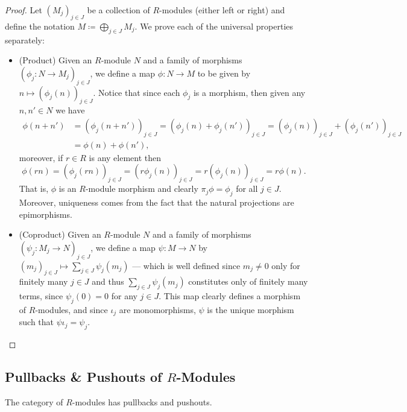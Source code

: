 \begin{proof}
Let \((M_j)_{j \in J}\) be a collection of \(R\)-modules (either left or right)
and define the notation \(M \coloneq \bigoplus_{j \in J} M_j\). We prove each of
the universal properties separately:
\begin{itemize}\setlength\itemsep{0em}
\item (Product) Given an \(R\)-module \(N\) and a family of morphisms
  \((\phi_j: N \to M_j)_{j \in J}\), we define a map \(\phi: N \to M\) to be
  given by \(n \mapsto (\phi_j(n))_{j \in J}\). Notice that since each
  \(\phi_j\) is a morphism, then given any \(n, n' \in N\) we have
  \begin{align*}
    \phi(n + n')
    &= (\phi_j(n + n'))_{j \in J}
      = (\phi_j(n) + \phi_j(n'))_{j \in J}
      = (\phi_j(n))_{j \in J} + (\phi_j(n'))_{j \in J} \\
    &= \phi(n) + \phi(n'),
  \end{align*}
  moreover, if \(r \in R\) is any element then
  \[
    \phi(r n)
      = (\phi_j(r n))_{j \in J}
      = (r \phi_j(n))_{j \in J}
      = r (\phi_j(n))_{j \in J}
      = r \phi(n).
  \]
  That is, \(\phi\) is an \(R\)-module morphism and clearly \(\pi_j \phi =
  \phi_j\) for all \(j \in J\). Moreover, uniqueness comes from the fact that
  the natural projections are epimorphisms.

\item (Coproduct) Given an \(R\)-module \(N\) and a family of morphisms
  \((\psi_j: M_j \to N)_{j \in J}\), we define a map \(\psi: M \to N\) by
  \((m_j)_{j \in J} \mapsto \sum_{j \in J} \psi_j(m_j)\) --- which is well
  defined since \(m_j \neq 0\) only for finitely many \(j \in J\) and thus
  \(\sum_{j \in J} \psi_j(m_j)\) constitutes only of finitely many terms, since
  \(\psi_j(0) = 0\) for any \(j \in J\). This map clearly defines a morphism of
  \(R\)-modules, and since \(\iota_j\) are monomorphisms, \(\psi\) is the unique
  morphism such that \(\psi \iota_j = \psi_{j}\).
\end{itemize}
\end{proof}

\subsection{Pullbacks \& Pushouts of \texorpdfstring{\(R\)}{R}-Modules}

\begin{theorem}
\label{thm:R-mod-pullback-pushouts}
The category of \(R\)-modules has pullbacks and pushouts.
\end{theorem}

